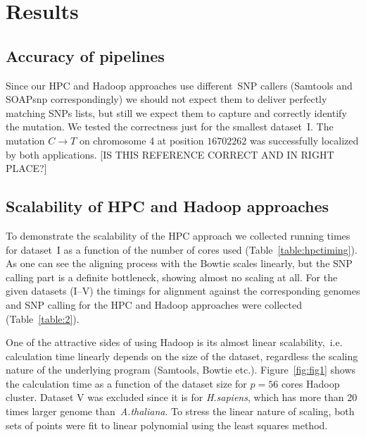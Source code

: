 \documentclass[11pt, oneside]{article}   	%
\begin{document}
\section{Results}
\label{sectionIII}

\subsection{Accuracy of pipelines}
Since our HPC and Hadoop approaches use different~SNP callers (Samtools and SOAPsnp correspondingly) we should not expect them to deliver perfectly matching SNPs lists, but still we expect them to capture and correctly identify the mutation. We tested the correctness just for the smallest dataset~I. The mutation $C\rightarrow T$ on chromosome 4 at position $16702262$ was successfully localized by both applications\cite{schneeberger}. [IS THIS REFERENCE CORRECT AND IN RIGHT PLACE?]

\subsection{Scalability of HPC and Hadoop approaches}
To demonstrate the scalability of  the HPC approach we collected running times for dataset~I as a function of the number of cores used (Table~\ref{table:hpctiming}).
As one can see the aligning process with the Bowtie scales linearly, but the SNP calling part is a definite bottleneck, showing almost no scaling at all.
For the given datasets (I--V) the timings for alignment against the corresponding genomes and SNP calling for  the HPC and Hadoop approaches were collected (Table~\ref{table:2}).

One of the attractive sides of using Hadoop is its almost linear scalability,~i.e. calculation time linearly depends on the size of the dataset\cite{crossbow,seal}, regardless the scaling nature of the underlying program (Samtools, Bowtie etc.). 
Figure~\ref{fig:fig1} shows the calculation time as a function of the dataset size for $p=56$ cores Hadoop cluster. Dataset V was excluded since it is for {\it H.sapiens}, which has more than 20 times larger genome than~{\it A.thaliana}.
To stress the linear nature of scaling, both sets of points were fit to linear polynomial using the least squares method.
\end{document}
